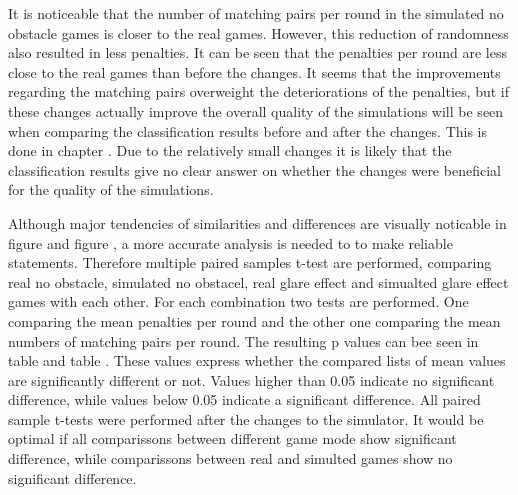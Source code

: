 It is noticeable that the number of matching pairs per round in the simulated no obstacle games is closer to the real games. However, this reduction of randomness also resulted in less penalties. It can be seen that the penalties per round are less close to the real games than before the changes. It seems that the improvements regarding the matching pairs overweight the deteriorations of the penalties, but if these changes actually improve the overall quality of the simulations will be seen when comparing the classification results before and after the changes. This is done in chapter . Due to the relatively small changes it is likely that the classification results give no clear answer on whether the changes were beneficial for the quality of the simulations.

Although major tendencies of similarities and differences are visually noticable in figure  and figure , a more accurate analysis is needed to to make reliable statements. Therefore multiple paired samples t-test are performed, comparing real no obstacle, simulated no obstacel, real glare effect and simualted glare effect games with each other. For each combination two tests are performed. One comparing the mean penalties per round and the other one comparing the mean numbers of matching pairs per round. The resulting p values can bee seen in table  and table . These values express whether the compared lists of mean values are significantly different or not. Values higher than 0.05 indicate no significant difference, while values below 0.05 indicate a significant difference. All paired sample t-tests were performed after the changes to the simulator. It would be optimal if all comparissons between different game mode show significant difference, while comparissons between real and simulted games show no significant difference.

